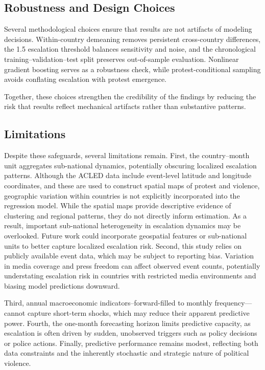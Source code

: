 \documentclass[12pt]{article}
\begin{document}
\subsection{Robustness and Design Choices}

Several methodological choices ensure that results are not artifacts of modeling decisions. Within-country demeaning removes persistent cross-country differences, the 1.5 escalation threshold balances sensitivity and noise, and the chronological training–validation–test split preserves out-of-sample evaluation. Nonlinear gradient boosting serves as a robustness check, while protest-conditional sampling avoids conflating escalation with protest emergence.

Together, these choices strengthen the credibility of the findings by reducing the risk that results reflect mechanical artifacts rather than substantive patterns.

\subsection{Limitations}

Despite these safeguards, several limitations remain. First, the country--month unit aggregates sub-national dynamics, potentially obscuring localized escalation patterns. Although the ACLED data include event-level latitude and longitude coordinates, and these are used to construct spatial maps of protest and violence, geographic variation within countries is not explicitly incorporated into the regression model. While the spatial maps provide descriptive evidence of clustering and regional patterns, they do not directly inform estimation. As a result, important sub-national heterogeneity in escalation dynamics may be overlooked. Future work could incorporate geospatial features or sub-national units to better capture localized escalation risk. Second, this study relies on publicly available event data, which may be subject to reporting bias. Variation in media coverage and press freedom can affect observed event counts, potentially understating escalation risk in countries with restricted media environments and biasing model predictions downward.

Third, annual macroeconomic indicators--forward-filled to monthly frequency—cannot capture short-term shocks, which may reduce their apparent predictive power. Fourth, the one-month forecasting horizon limits predictive capacity, as escalation is often driven by sudden, unobserved triggers such as policy decisions or police actions. Finally, predictive performance remains modest, reflecting both data constraints and the inherently stochastic and strategic nature of political violence.
\end{document}
